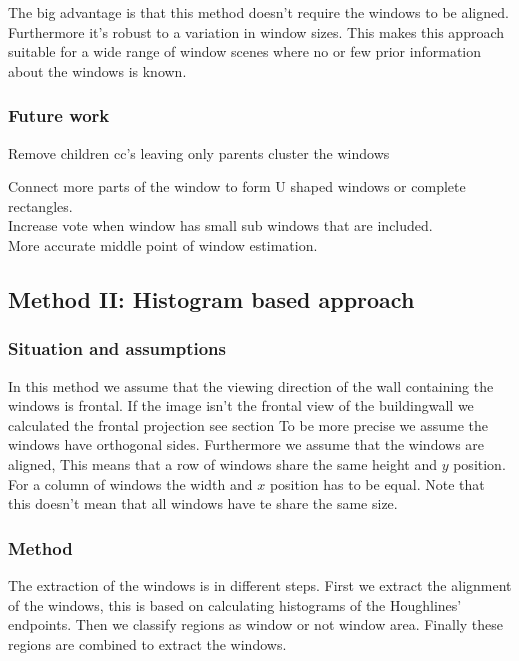 The big advantage is that this method doesn't require the windows to be aligned.
Furthermore it's robust to a variation in window sizes. This makes this approach suitable
for a wide range of window scenes where no or few prior information about the
	windows is known.


\subsubsection{Future work}
Remove children cc's leaving only parents
cluster the windows

Connect more parts of the window to form U shaped windows or complete rectangles.\\
Increase vote when window has small sub windows that are included.\\
More accurate middle point of window estimation. 


\subsection{Method II: Histogram based approach} 
\subsubsection{Situation and assumptions}
In this method we assume that the viewing direction of the wall containing the windows is frontal.
If the image isn't the frontal view of the buildingwall we calculated the frontal projection
see section %
To be more precise we assume the windows have orthogonal sides.  Furthermore we
assume that the windows are aligned, This means that a row of windows share the
same height and $y$ position. For a column of windows the width and $x$
position has to be equal.  Note that this doesn't mean that all windows have te
share the same size.

\subsubsection{Method}
The extraction of the windows is in different steps. First we extract the alignment of the windows, this is based on
calculating histograms of the Houghlines' endpoints. Then we classify regions as window or not window area.
Finally these regions are combined to extract the windows.


